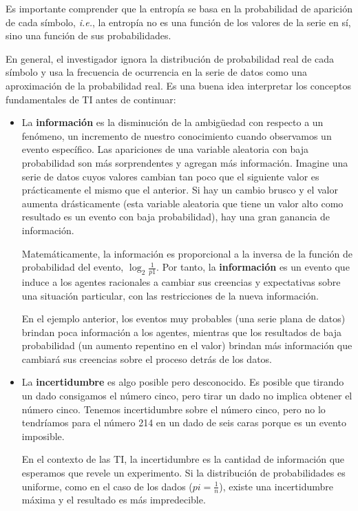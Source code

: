 \documentclass[a4paper,12pt]{article}
\begin{document}
Es importante comprender que la entropía se basa en la probabilidad de aparición de cada símbolo, \textit{i.e.}, la entropía no es una función de los valores de la serie en sí, sino una función de sus probabilidades. 

En general, el investigador ignora la distribución de probabilidad real de cada símbolo y usa la frecuencia de ocurrencia en la serie de datos como una aproximación de la probabilidad real. Es una buena idea interpretar los conceptos fundamentales de TI antes de continuar:

\begin{itemize}[noitemsep, topsep=2pt]
	\item La \textbf{información} es la disminución de la ambigüedad con respecto a un fenómeno, un incremento de nuestro conocimiento cuando observamos un evento específico. Las apariciones de una variable aleatoria con baja probabilidad son más sorprendentes y agregan más información. Imagine una serie de datos cuyos valores cambian tan poco que el siguiente valor es prácticamente el mismo que el anterior. Si hay un cambio brusco y el valor aumenta drásticamente (esta variable aleatoria que tiene un valor alto como resultado es un evento con baja probabilidad), hay una gran ganancia de información. 
	      	
	      Matemáticamente, la información es proporcional a la inversa de la función de probabilidad del evento, $\log_2 \frac{1}{p1}$. Por tanto, la \textbf{información} es un evento que induce a los agentes racionales a cambiar sus creencias y expectativas sobre una situación particular, con las restricciones de la nueva información. 
	      	
	      \clearpage	
	      	
	      En el ejemplo anterior, los eventos muy probables (una serie plana de datos) brindan poca información a los agentes, mientras que los resultados de baja probabilidad (un aumento repentino en el valor) brindan más información que cambiará sus creencias sobre el proceso detrás de los datos. 
	      
	\item La \textbf{incertidumbre} es algo posible pero desconocido. Es posible que tirando un dado consigamos el número cinco, pero tirar un dado no implica obtener el número cinco. Tenemos incertidumbre sobre el número cinco, pero no lo tendríamos para el número 214 en un dado de seis caras porque es un evento imposible. 
	      
	      En el contexto de las TI, la incertidumbre es la cantidad de información que esperamos que revele un experimento. Si la distribución de probabilidades es uniforme, como en el caso de los dados ($pi = \frac{1}{n}$), existe una incertidumbre máxima y el resultado es más impredecible. 
	      

\end{itemize}
\end{document}
